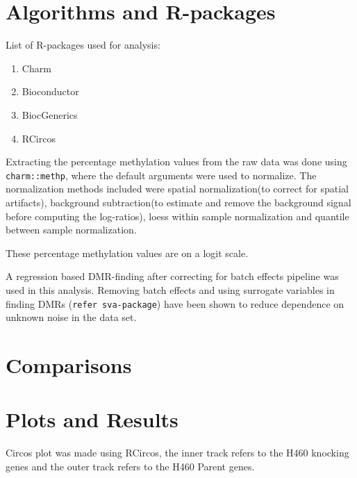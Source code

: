 \documentclass[11pt]{article}
\begin{document}
\section*{Algorithms and R-packages}

List of R-packages used for analysis:
\begin{enumerate}

\item Charm

\item Bioconductor

\item BiocGenerics

\item RCircos

\end{enumerate}

Extracting the percentage methylation values from the raw data was done using {\tt charm::methp}, where the default arguments were used to normalize. The normalization methods included were spatial normalization(to correct for spatial artifacts), background subtraction(to estimate and remove the background signal before computing the log-ratios), loess within sample normalization and quantile between sample normalization.

These percentage methylation values are on a logit scale.

A regression based DMR-finding after correcting for batch effects pipeline was used in this analysis. Removing batch effects and using surrogate variables in finding DMRs ({\tt refer sva-package}) have been shown to reduce dependence on unknown noise in the data set.



\section*{Comparisons}



\section*{Plots and Results}

Circos plot was made using RCircos, the inner track refers to the H460 knocking genes and the outer track refers to the H460 Parent genes.
\end{document}
